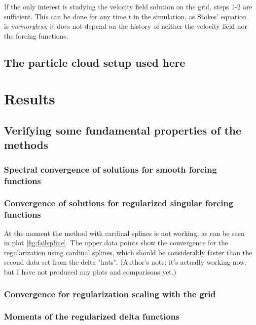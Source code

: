\documentclass[a4paper,twoside=false,abstract=false,numbers=noenddot,
titlepage=false,headings=small,parskip=half,version=last]{scrartcl}
\begin{document}
If the only interest is studying the velocity field solution on the grid, steps 1-2 are sufficient. This can be done for any time $t$ in the simulation, as Stokes' equation is \emph{memoryless}, it does not depend on the history of neither the velocity field nor the forcing functions.

\subsection{The particle cloud setup used here}

\section{Results}

\subsection{Verifying some fundamental properties of the methods}
\subsubsection{Spectral convergence of solutions for smooth forcing functions}
\subsubsection{Convergence of solutions for regularized singular forcing functions}

At the moment the method with cardinal splines is not working, as can be seen in plot \ref{fig:failspline}. The upper data points show the convergence for the regularization using cardinal splines, which should be considerably faster than the second data set from the delta "hats". (Author's note: it's actually working now, but I have not produced any plots and comparisons yet.)

\subsubsection{Convergence for regularization scaling with the grid}
\subsubsection{Moments of the regularized delta functions}
\end{document}

